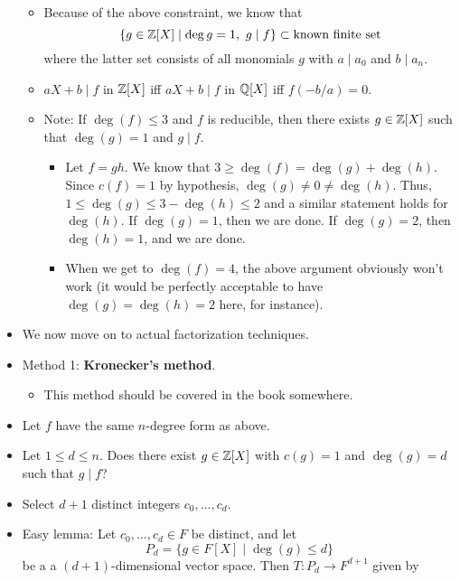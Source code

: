 \documentclass[../notes.tex]{subfiles}
\begin{document}
\begin{itemize}
\begin{itemize}
\begin{itemize}
        \end{itemize}
        \item Because of the above constraint, we know that
        \begin{equation*}
            \{g\in\mathbb{Z}[X]\mid \deg g=1,\ g\mid f\} \subset \text{known finite set}
        \end{equation*}
        where the latter set consists of all monomials $g$ with $a\mid a_0$ and $b\mid a_n$.
        \item $aX+b\mid f$ in $\mathbb{Z}[X]$ iff $aX+b\mid f$ in $\mathbb{Q}[X]$ iff $f(-b/a)=0$.
        \item Note: If $\deg(f)\leq 3$ and $f$ is reducible, then there exists $g\in\mathbb{Z}[X]$ such that $\deg(g)=1$ and $g\mid f$.
        \begin{itemize}
            \item Let $f=gh$. We know that $3\geq\deg(f)=\deg(g)+\deg(h)$. Since $c(f)=1$ by hypothesis, $\deg(g)\neq 0\neq\deg(h)$. Thus, $1\leq\deg(g)\leq 3-\deg(h)\leq 2$ and a similar statement holds for $\deg(h)$. If $\deg(g)=1$, then we are done. If $\deg(g)=2$, then $\deg(h)=1$, and we are done.
            \item When we get to $\deg(f)=4$, the above argument obviously won't work (it would be perfectly acceptable to have $\deg(g)=\deg(h)=2$ here, for instance).
        \end{itemize}
    \end{itemize}
    \item We now move on to actual factorization techniques.
    \item Method 1: \textbf{Kronecker's method}.
    \begin{itemize}
        \item This method should be covered in the book somewhere.
    \end{itemize}
    \item Let $f$ have the same $n$-degree form as above.
    \item Let $1\leq d\leq n$. Does there exist $g\in\mathbb{Z}[X]$ with $c(g)=1$ and $\deg(g)=d$ such that $g\mid f$?
    \item Select $d+1$ distinct integers $c_0,\dots,c_d$.
    \item Easy lemma: Let $c_0,\dots,c_d\in F$ be distinct, and let
    \begin{equation*}
        P_d = \{g\in F[X]\mid\deg(g)\leq d\}
    \end{equation*}
    be a a $(d+1)$-dimensional vector space. Then $T:P_d\to F^{d+1}$ given by

\end{itemize}
\end{document}
